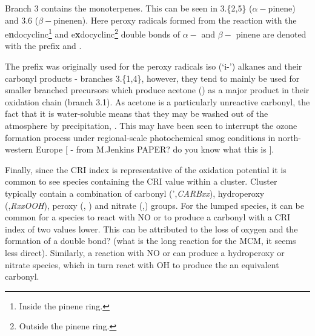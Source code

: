 Branch 3 contains the monoterpenes. This can be seen in 3.\{2,5\} ($\alpha-$pinene) and 3.6 ($\beta-$pinenen). Here peroxy radicals formed from the reaction with the e\textbf{n}docyclinc\footnote{Inside the pinene ring.} and e\textbf{x}docyclinc\footnote{Outside the pinene ring.} double bonds of $\alpha-$ and $\beta-$ pinene are denoted with the prefix \emph{} and \emph{}.

The \emph{} prefix was originally used for the peroxy radicals iso (`i-') alkanes and their carbonyl products - branches 3.\{1,4\}, however, they tend to mainly be used for smaller branched precursors which produce acetone () as a major product in their oxidation chain (branch 3.1). As acetone is a particularly unreactive carbonyl, the fact that it is water-soluble means that they may be washed out of the atmosphere by precipitation, \citep{acetonerain}. This may have been seen to interrupt the ozone formation process under regional-scale photochemical smog conditions in north-western Europe [ - from M.Jenkins PAPER? do you know what this is ].

Finally, since the CRI index is representative of the oxidation potential it is common to see species containing the CRI value within a cluster. Cluster typically contain a combination of carbonyl (',\emph{CARBxx}), hydroperoxy (,\emph{RxxOOH}), peroxy (, \emph{}) and nitrate (,\emph{}) groups. For the lumped species, it can be common for a  species to react with NO or  to produce a carbonyl with a CRI index of two values lower. This can be attributed to the loss of oxygen and the formation of a double bond? (what is the long reaction for the MCM, it seems less direct). Similarly, a reaction with NO or  can produce a hydroperoxy or nitrate species, which in turn react with OH to produce the an equivalent carbonyl.


% 
% 
% 
% 
% 



